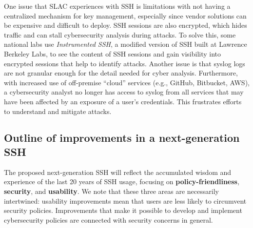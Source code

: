 \documentclass[10pt]{article}
\begin{document}
One issue that SLAC experiences with SSH is limitations with not
having a centralized mechanism for key management, especially since
vendor solutions can be expensive and difficult to deploy. SSH
sessions are also encrypted, which hides traffic and can stall
cybersecurity analysis during attacks. To solve this, some national
labs use \emph{Instrumented SSH}, a modified version of SSH built at
Lawrence Berkeley Labs, to see the content of SSH sessions and gain
visibility into encrypted sessions that help to identify
attacks. Another issue is that syslog logs are not granular enough for
the detail needed for cyber analysis. Furthermore, with increased use
of off-premise ``cloud'' services (e.g., GitHub, Bitbucket, AWS), a
cybersecurity analyst no longer has access to syslog from all services
that may have been affected by an exposure of a user's credentials.
This frustrates efforts to understand and mitigate attacks.

\subsection{Outline of improvements in a next-generation SSH}
\label{ss:outline}
The proposed next-generation SSH will reflect the accumulated wisdom
and experience of the last 20 years of SSH usage, focusing on
\textbf{policy-friendliness}, \textbf{security}, and
\textbf{usability}. We note that these three areas are necessarily
intertwined: usability improvements mean that users are less likely to
circumvent security policies. Improvements that make it possible to
develop and implement cybersecurity policies are
connected with security concerns in general.
\end{document}
